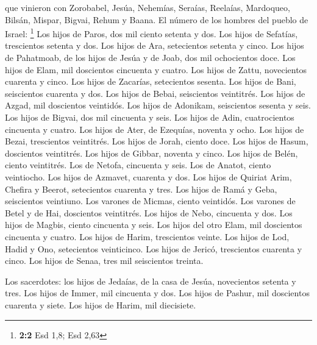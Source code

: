 \begin{paracol}{2}
 que vinieron con Zorobabel, Jesúa, Nehemías, Seraías,
Reelaías, Mardoqueo, Bilsán, Mispar, Bigvai, Rehum y Baana. El número de
los hombres del pueblo de Israel: \footnote{\textbf{2:2} Esd 1,8; Esd
  2,63}  Los hijos de Paros, dos mil ciento setenta y dos.
 Los hijos de Sefatías, trescientos setenta y dos.
 Los hijos de Ara, setecientos setenta y cinco.
 Los hijos de Pahatmoab, de los hijos de Jesúa y de Joab,
dos mil ochocientos doce.  Los hijos de Elam, mil
doscientos cincuenta y cuatro.  Los hijos de Zattu,
novecientos cuarenta y cinco.  Los hijos de Zacarías,
setecientos sesenta.  Los hijos de Bani, seiscientos
cuarenta y dos.  Los hijos de Bebai, seiscientos
veintitrés.  Los hijos de Azgad, mil doscientos
veintidós.  Los hijos de Adonikam, seiscientos sesenta y
seis.  Los hijos de Bigvai, dos mil cincuenta y seis.
 Los hijos de Adin, cuatrocientos cincuenta y cuatro.
 Los hijos de Ater, de Ezequías, noventa y ocho.
 Los hijos de Bezai, trescientos veintitrés.
 Los hijos de Jorah, ciento doce.  Los
hijos de Hasum, doscientos veintitrés.  Los hijos de
Gibbar, noventa y cinco.  Los hijos de Belén, ciento
veintitrés.  Los de Netofa, cincuenta y seis.
 Los de Anatot, ciento veintiocho.  Los
hijos de Azmavet, cuarenta y dos.  Los hijos de Quiriat
Arim, Chefira y Beerot, setecientos cuarenta y tres.  Los
hijos de Ramá y Geba, seiscientos veintiuno.  Los varones
de Micmas, ciento veintidós.  Los varones de Betel y de
Hai, doscientos veintitrés.  Los hijos de Nebo, cincuenta
y dos.  Los hijos de Magbis, ciento cincuenta y seis.
 Los hijos del otro Elam, mil doscientos cincuenta y
cuatro.  Los hijos de Harim, trescientos veinte.
 Los hijos de Lod, Hadid y Ono, setecientos veinticinco.
 Los hijos de Jericó, trescientos cuarenta y cinco.
 Los hijos de Senaa, tres mil seiscientos treinta.

 Los sacerdotes: los hijos de Jedaías, de la casa de
Jesúa, novecientos setenta y tres.  Los hijos de Immer,
mil cincuenta y dos.  Los hijos de Pashur, mil doscientos
cuarenta y siete.  Los hijos de Harim, mil diecisiete.


\end{paracol}
